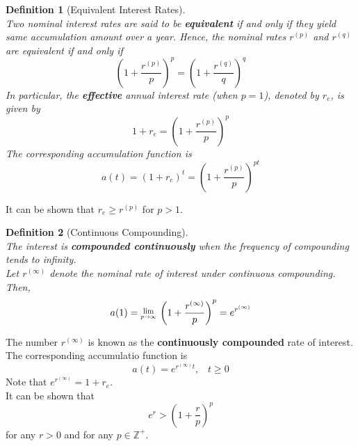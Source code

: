 \documentclass[11pt]{article}
\newcommand{\Lim}[1]{\raisebox{0.5ex}{\scalebox{0.8}{$\displaystyle \lim_{#1}\;$}}}
\newtheorem{definition}{Definition}[section]
\theoremstyle{definition}
\begin{document}
\begin{definition}[Equivalent Interest Rates]
\hfill\\\normalfont Two nominal interest rates are said to be \textbf{equivalent} if and only if they yield same accumulation amount over a year. Hence, the nominal rates $r^{(p)}$ and $r^{(q)}$ are equivalent if and only if
\[
\left(1+\frac{r^{(p)}}{p}\right)^p=\left(1+\frac{r^{(q)}}{q}\right)^q
\]
In particular, the \textbf{effective} annual interest rate (when $p=1$), denoted by $r_e$, is given by
\[
1+r_e = \left(1+\frac{r^{(p)}}{p}\right)^p
\]
The corresponding accumulation function is
\[
a(t) = (1+r_e)^t = \left(1+\frac{r^{(p)}}{p}\right)^{pt}
\]
\end{definition}
It can be shown that $r_e\geq r^{(p)}$ for $p>1$.
\begin{definition}[Continuous Compounding]
\hfill\\\normalfont The interest is \textbf{compounded continuously} when the frequency of compounding tends to infinity.\\
Let $r^{(\infty)}$ denote the nominal rate of interest under continuous compounding. Then,
\[
a(1)=\Lim{p\to\infty}\left(1+\frac{r^{(\infty)}}{p}\right)^p = e^{r^{(\infty)}}
\]
\end{definition}
The number $r^{(\infty)}$ is known as the \textbf{continuously compounded} rate of interest.
The corresponding accumulatio function is
\[
a(t) = e^{r^{(\infty)}t},\;\;\;t\geq 0
\]
Note that $e^{r^{(\infty)}}= 1+r_e$.\\
It can be shown that
\[
e^r>\left(1+\frac{r}{p}\right)^p
\]
for any $r>0$ and for any $p\in\mathbb{Z}^+$.
\end{document}
